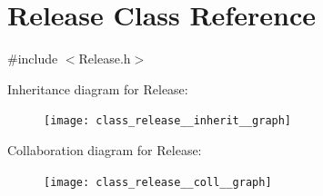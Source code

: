 \hypertarget{class_release}{\section{Release Class Reference}
\label{class_release}
}


{\ttfamily \#include $<$Release.\-h$>$}



Inheritance diagram for Release\-:\nopagebreak
\begin{figure}[H]
\begin{center}
\leavevmode
\texttt{[image: class\_release\_\_inherit\_\_graph]}
\end{center}
\end{figure}


Collaboration diagram for Release\-:\nopagebreak
\begin{figure}[H]
\begin{center}
\leavevmode
\texttt{[image: class\_release\_\_coll\_\_graph]}
\end{center}
\end{figure}
